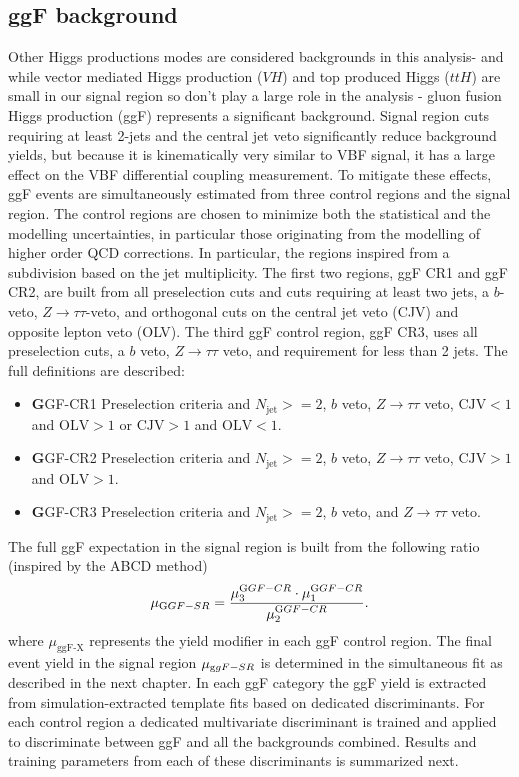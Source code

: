 \subsection{ggF background}
Other Higgs productions modes are considered backgrounds in this analysis- and while vector mediated Higgs production ($VH$) and top produced Higgs ($ttH$) are small in our signal region so don't play a large role in the analysis - gluon fusion Higgs production (ggF) represents a significant background. Signal region cuts requiring at least 2-jets and the central jet veto significantly reduce background yields, but because it is kinematically very similar to VBF signal, it has a large effect on the VBF differential coupling measurement. To mitigate these effects, ggF events are simultaneously estimated from three control regions and the signal region. The control regions are chosen to minimize both the statistical and the modelling uncertainties, in particular those originating from the modelling of higher order QCD corrections. In particular, the regions inspired from a subdivision based on the jet multiplicity. The first two regions, ggF CR1 and ggF CR2, are built from all preselection cuts and cuts requiring at least two jets, a $b$-veto, $Z\rightarrow\tau\tau$-veto, and orthogonal cuts on the central jet veto (CJV) and opposite lepton veto (OLV). The third ggF control region, ggF CR3, uses all preselection cuts, a $b$ veto, $Z\rightarrow \tau\tau$ veto, and requirement for less than 2 jets. The full definitions are described:  
\begin{itemize} 
\item {\textbf GGF-CR1} Preselection criteria and $N_{ \text{jet}}>=2$, $b$ veto, $Z\rightarrow\tau\tau$ veto, $\text{CJV}<1$ and $\text{OLV}>1$ or $\text{CJV}>1$ and $\text{OLV}<1$.
\item {\textbf GGF-CR2} Preselection criteria and $N_{ \text{jet}}>=2$, $b$ veto, $Z\rightarrow\tau\tau$ veto, $\text{CJV} > 1$ and $\text{OLV} > 1$. 
\item {\textbf GGF-CR3} Preselection criteria and $N_{ \text{jet}}>=2$, $b$ veto, and $Z\rightarrow\tau\tau$ veto. 
\end{itemize} 
The full ggF expectation in the signal region is built from the following ratio (inspired by the ABCD method) 
\begin{equation}
	\mu_{{\text GGF-SR}} = \frac{\mu^{{\text GGF-CR}}_{3} \cdot\mu^{{\text GGF-CR}}_{1}}{ \mu^{{\text GGF-CR}}_{2}}.
\end{equation}
where $\mu_{\text{ggF-X}}$ represents the yield modifier in each ggF control region. The final event yield in the signal region $\mu_{{\text ggF-SR}}$ is determined in the simultaneous fit as described in the next chapter. In each ggF category the ggF yield is extracted from simulation-extracted template fits based on dedicated discriminants. For each control region a dedicated multivariate discriminant is trained and applied to discriminate between ggF and all the backgrounds combined. Results and training parameters from each of these discriminants is summarized next.

